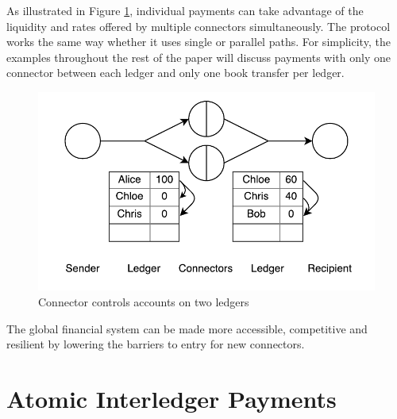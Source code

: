 \documentclass[letterpaper,twocolumn,10pt]{article}
\begin{document}
As illustrated in Figure \ref{fig:parallel-path}, individual payments can take advantage of the liquidity and rates offered by multiple connectors simultaneously. The protocol works the same way whether it uses single or parallel paths. For simplicity, the examples throughout the rest of the paper will discuss payments with only one connector between each ledger and only one book transfer per ledger.

\begin{figure}[ht]
    \centering
    \includegraphics[width=\columnwidth]{figures/parallel-path.pdf}
    \caption{Connector controls accounts on two ledgers}
    \label{fig:parallel-path}
\end{figure}

The global financial system can be made more accessible, competitive and resilient by lowering the barriers to entry for new connectors.

\section{Atomic Interledger Payments}


\end{document}
